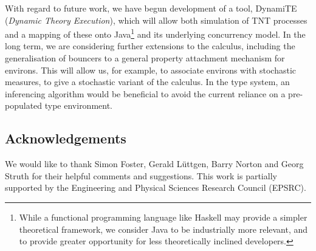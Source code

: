 \documentclass[orivec,envcountsame]{llncs}
\begin{document}
With regard to future work, we have begun development of a tool,
DynamiTE (\emph{Dynamic Theory Execution}), which will allow both
simulation of TNT processes and a mapping of these onto
Java\footnote{While a functional programming language like Haskell may
provide a simpler theoretical framework, we consider Java to be
industrially more relevant, and to provide greater opportunity for less
theoretically inclined developers.} and its underlying concurrency
model.  In the long term, we are considering further extensions to the
calculus, including the generalisation of bouncers to a general property
attachment mechanism for environs.  This will allow us, for example, to
associate environs with stochastic measures, to give a stochastic
variant of the calculus.  In the type system, an inferencing algorithm
would be beneficial to avoid the current reliance on a pre-populated
type environment.

\subsection*{Acknowledgements}

We would like to thank Simon Foster, Gerald L{\"u}ttgen, Barry Norton
and Georg Struth for their helpful comments and suggestions.  This work
is partially supported by the Engineering and Physical Sciences Research
Council ({EPSRC}).



\end{document}
